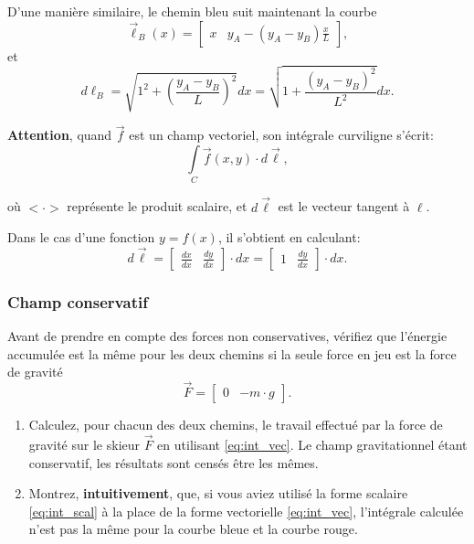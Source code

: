 \documentclass{cup-pan}
\begin{document}
D'une manière similaire, le chemin bleu suit maintenant la courbe
\begin{equation}
    \vec{\ell}_B(x) = \begin{bmatrix}x & y_A - (y_A - y_B)\frac{x}{L}\end{bmatrix},
\end{equation}
et
\begin{equation}
    d\ell_B = \sqrt{1^2 + (\frac{y_A - y_B}{L})^2} dx = \sqrt{1 + \frac{(y_A - y_B)^2}{L^2}} dx.
\end{equation}

\textbf{Attention}, quand $\vec{f}$ est un champ vectoriel, son intégrale curviligne s'écrit:
\begin{equation}\label{eq:int_vec}
    \int\limits_C \vec{f}(x,y) \cdot d\vec{\ell},
\end{equation}

où $<\cdot>$ représente le produit scalaire, et $d\vec{\ell}$ est le vecteur tangent à $\ell$.

Dans le cas d'une fonction $y = f(x)$, il s'obtient en calculant:
\begin{equation}
    d\vec{\ell} = \begin{bmatrix}\frac{dx}{dx} & \frac{dy}{dx}\end{bmatrix} \cdot dx = \begin{bmatrix} 1 & \frac{dy}{dx}\end{bmatrix} \cdot dx.
\end{equation}


\subsubsection{Champ conservatif}

Avant de prendre en compte des forces non conservatives, vérifiez que l'énergie accumulée est la même pour les deux chemins si la seule force en jeu est la force de gravité
\begin{equation}
\vec{F} = \begin{bmatrix} 0 & -m\cdot g\end{bmatrix}.
\end{equation}

\questions
\begin{enumerate}
    \item Calculez, pour chacun des deux chemins, le travail effectué par la force de gravité sur le skieur $\vec{F}$ en utilisant \eqref{eq:int_vec}. Le champ gravitationnel étant conservatif, les résultats sont censés être les mêmes.
    \item Montrez, \textbf{intuitivement}, que, si vous aviez utilisé la forme scalaire \eqref{eq:int_scal} à la place de la forme vectorielle \eqref{eq:int_vec}, l'intégrale calculée n'est pas la même pour la courbe bleue et la courbe rouge.
\end{enumerate}
\end{document}
